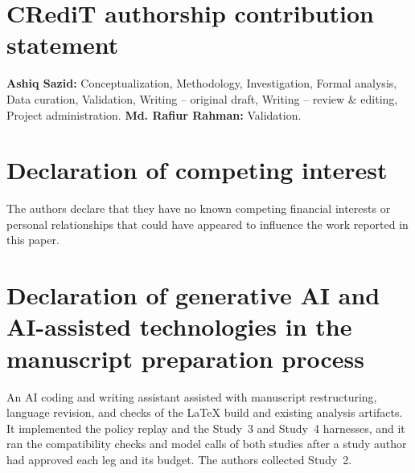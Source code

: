 \documentclass[final,5p,times,twocolumn]{elsarticle}
\begin{document}
\section*{CRediT authorship contribution statement}
\textbf{Ashiq Sazid:} Conceptualization, Methodology, Investigation, Formal
analysis, Data curation, Validation, Writing -- original draft, Writing --
review \& editing, Project administration. \textbf{Md. Rafiur Rahman:}
Validation.


\section*{Declaration of competing interest}
The authors declare that they have no known competing financial interests or
personal relationships that could have appeared to influence the work reported
in this paper.

\section*{Declaration of generative AI and AI-assisted technologies in the manuscript preparation process}
An AI coding and writing assistant assisted with manuscript restructuring,
language revision, and checks of the LaTeX build and existing analysis
artifacts. It implemented the policy replay and the Study~3 and Study~4
harnesses, and it ran the compatibility checks and model calls of both studies
after a study author had approved each leg and its budget. The authors
collected Study~2.
\end{document}
